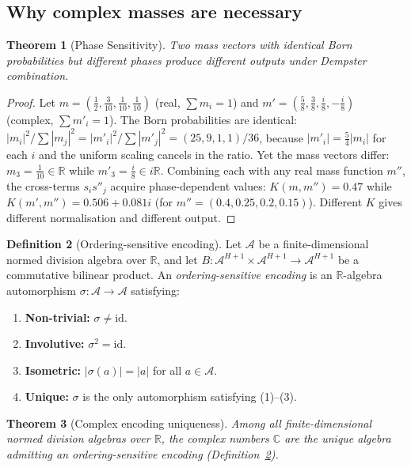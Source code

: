 \documentclass[11pt,a4paper]{article}
\newtheorem{theorem}{Theorem}[section]
\theoremstyle{definition}
\newtheorem{definition}[theorem]{Definition}
\theoremstyle{remark}
\newcommand{\C}{\mathbb{C}}
\newcommand{\R}{\mathbb{R}}
\begin{document}
\subsection{Why complex masses are necessary}\label{sec:complex}

\begin{theorem}[Phase Sensitivity]\label{thm:phase}
Two mass vectors with identical Born probabilities but different phases produce different outputs under Dempster combination.
\end{theorem}

\begin{proof}
Let $m=(\tfrac{1}{2},\tfrac{3}{10},\tfrac{1}{10},\tfrac{1}{10})$ (real, $\sum m_i=1$) and $m'=(\tfrac{5}{8},\tfrac{3}{8},\tfrac{i}{8},-\tfrac{i}{8})$ (complex, $\sum m'_i=1$). The Born probabilities are identical: $|m_i|^2/\sum|m_j|^2=|m'_i|^2/\sum|m'_j|^2=(25,9,1,1)/36$, because $|m'_i|=\tfrac{5}{4}|m_i|$ for each $i$ and the uniform scaling cancels in the ratio. Yet the mass vectors differ: $m_3=\tfrac{1}{10}\in\R$ while $m'_3=\tfrac{i}{8}\in i\R$. Combining each with any real mass function $m''$, the cross-terms $s_is''_j$ acquire phase-dependent values: $K(m,m'')=0.47$ while $K(m',m'')=0.506+0.081i$ (for $m''=(0.4,0.25,0.2,0.15)$). Different $K$ gives different normalisation and different output.
\end{proof}

\begin{definition}[Ordering-sensitive encoding]\label{def:encoding}
Let $\mathcal{A}$ be a finite-dimensional normed division algebra over $\R$, and let $B:\mathcal{A}^{H+1}\times\mathcal{A}^{H+1}\to\mathcal{A}^{H+1}$ be a commutative bilinear product. An \emph{ordering-sensitive encoding} is an $\R$-algebra automorphism $\sigma:\mathcal{A}\to\mathcal{A}$ satisfying:
\begin{enumerate}[nosep]
\item \textbf{Non-trivial:} $\sigma\neq\mathrm{id}$.
\item \textbf{Involutive:} $\sigma^2=\mathrm{id}$.
\item \textbf{Isometric:} $|\sigma(a)|=|a|$ for all $a\in\mathcal{A}$.
\item \textbf{Unique:} $\sigma$ is the only automorphism satisfying (1)--(3).
\end{enumerate}
\end{definition}

\begin{theorem}[Complex encoding uniqueness]\label{thm:complex_unique}
Among all finite-dimensional normed division algebras over $\R$, the complex numbers $\C$ are the unique algebra admitting an ordering-sensitive encoding (Definition~\ref{def:encoding}).
\end{theorem}
\end{document}
